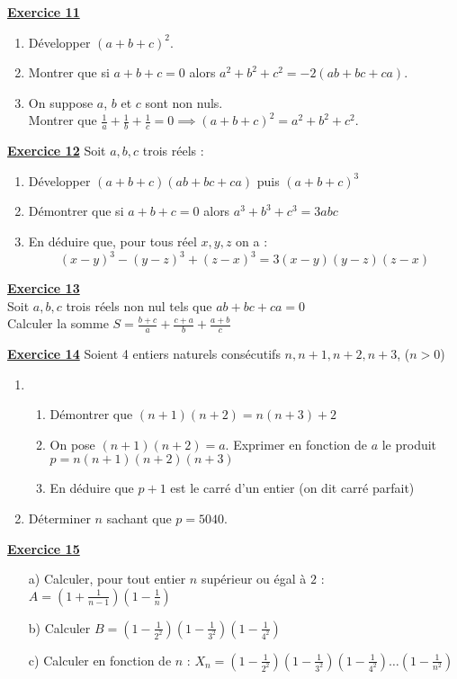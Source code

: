 \documentclass[12pt,a4paper]{article}
\newcommand{\exo}[1]{%
        \textbf{\underline{Exercice #1}}
}
\begin{document}
\exo{11}
\begin{enumerate}
    \item Développer $(a + b + c)^2$.
    \item Montrer que si $a + b + c = 0$ alors $a^2 + b^2 + c^2 = -2 (ab + bc + ca)$.
    \item On suppose $a$, $b$ et $c$ sont non nuls. \\
    Montrer que $\frac{1}{a} + \frac{1}{b} + \frac{1}{c} = 0 \implies (a + b + c)^2 = a^2 + b^2 + c^2$.
\end{enumerate}
\exo{12} Soit $a, b, c$ trois réels :
\begin{enumerate}
    \item Développer $(a + b + c)(ab + bc + ca)$ puis $(a + b + c)^3$
    \item Démontrer que si $a + b + c = 0$ alors $a^3 + b^3 + c^3 = 3abc$
    \item En déduire que, pour tous réel $x, y, z$ on a :
    $$(x - y)^3 - (y - z)^3 + (z - x)^3 = 3 (x - y) (y - z) (z - x)$$
\end{enumerate}

\exo{13} \\
Soit $a, b, c$ trois réels non nul tels que $ab + bc + ca = 0$ \\
Calculer la somme $S=\frac{b+c}{a} + \frac{c+a}{b} + \frac{a+b}{c}$

\exo{14} Soient 4 entiers naturels consécutifs $n, n+1, n+2, n+3$, ($n > 0$)
\begin{enumerate}
    \item 
    \begin{enumerate}
        \item Démontrer que $(n+1) (n+2) = n (n+3) + 2$
        \item On pose $(n+1) (n+2) = a$. Exprimer en fonction de $a$ le produit $p = n (n+1) (n+2) (n+3)$
        \item En déduire que $p + 1$ est le carré d'un entier (on dit carré parfait)
    \end{enumerate}
    \item Déterminer $n$ sachant que $p = 5040$.
\end{enumerate}

\exo{15}

\begin{enumerate}
    \item[a)] Calculer, pour tout entier $n$ supérieur ou égal à $2$ : $A = \left(1+\frac{1}{n-1}\right) \left(1-\frac{1}{n}\right)$
    \item[b)] Calculer $B = \left(1-\frac{1}{2^2}\right) \left(1-\frac{1}{3^2}\right) \left(1-\frac{1}{4^2}\right)$
    \item[c)] Calculer en fonction de $n$ : $X_n = \left(1-\frac{1}{2^2}\right) \left(1-\frac{1}{3^2}\right) \left(1-\frac{1}{4^2}\right) \dots \left(1-\frac{1}{n^2}\right)$
\end{enumerate}
\end{document}
